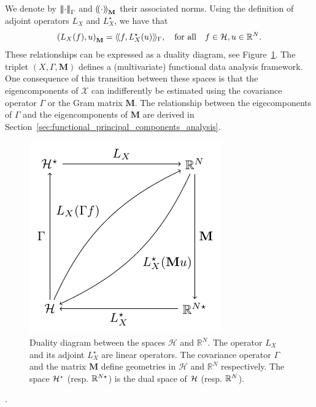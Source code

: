 {\begin{equation}
\end{equation}
We denote by $\left|\!\left|\!\left|\cdot\right|\!\right|\!\right|_\Gamma$ and $\left(\!\left(\cdot\right)\!\right)_{\mathbf{M}}$ their associated norms.
Using the definition of adjoint operators $L_X$ and $L^\star_X$, we have that
\begin{equation}
    \left(L_X(f), u\right)_{\mathbf{M}} = \langle\!\langle f, L^\star_X(u)\rangle\!\rangle_\Gamma, \quad\text{for all}\quad f \in \mathcal{H}, u \in \mathbb{R}^N.
\end{equation}
These relationships can be expressed as a duality diagram, see Figure~\ref{fig:duality_diagram}. The triplet $(X, \Gamma, \mathbf{M})$ defines a (multivariate) functional data analysis framework. One consequence of this transition between these spaces is that the eigencomponents of $\mathcal{X}$ can indifferently be estimated using the covariance operator $\Gamma$ or the Gram matrix $\mathbf{M}$.} The relationship between the eigecomponents of $\Gamma$ and the eigencomponents of $\mathbf{M}$ are derived in Section~\ref{sec:functional_principal_components_analysis}.
\begin{figure}
    \centering
    \includegraphics[scale=1.2]{figures/duality_diagram.pdf}
    \caption{Duality diagram between the spaces $\mathcal{H}$ and $\mathbb{R}^N$. The operator $L_X$ and its adjoint $L^\star_X$ are linear operators. The covariance operator $\Gamma$ and the matrix $\mathbf{M}$ define geometries in $\mathcal{H}$ and $\mathbb{R}^N$ respectively. The space $\mathcal{H}^\star$ (resp. $\mathbb{R}^{N \star}$) is the dual space of $\mathcal{H}$ (resp. $\mathbb{R}^N$).}
    \label{fig:duality_diagram}
\end{figure}

\begin{remark}
   .
\end{remark}

